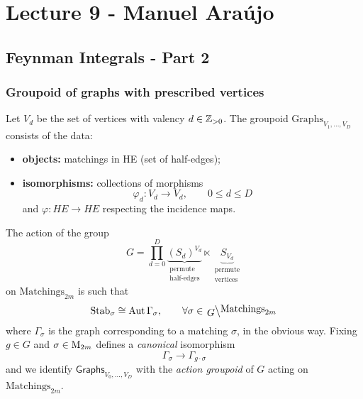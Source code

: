 \chapter{Lecture 9 - Manuel Araújo}

\section{Feynman Integrals - Part 2}

\subsection{Groupoid of graphs with prescribed vertices}

Let $V_d$ be the set of vertices with valency $d \in \mathbb{Z}_{>0}$.
The groupoid $\mathrm{Graphs}_{V_1, \dots, V_D}$ consists of the data:
\begin{itemize}
  \item \textbf{objects:} matchings in HE (set of half-edges);
  \item \textbf{isomorphisms:} collections of morphisms
    \begin{equation*}
      \varphi_d \colon V_d \longrightarrow V_d, \qquad 0 \leq d \leq D
    \end{equation*}
    and $\varphi \colon HE \to HE$ respecting the incidence maps.
\end{itemize}

The action of the group
\begin{equation*}
  G = \prod_{d = 0}^D
  \underbrace{(S_d)^{V_d}}_{\substack{
      \text{permute} \\ \text{half-edges}
  }} \ltimes 
  \underbrace{S_{V_d}}_{\substack{
      \text{permute} \\ \text{vertices}
  }}
\end{equation*}
on $\text{Matchings}_{2m}$ is such that
\begin{equation*}
  \Stab_\sigma \cong \Aut \Gamma_\sigma, \qquad \forall \sigma \in \lbigslant{G}{\text{Matchings}_{2m}}
\end{equation*}
where $\Gamma_\sigma$ is the graph corresponding to a matching $\sigma$, in the obvious way.
Fixing $g \in G$ and $\sigma \in \mathrm{M}_{2m}$ defines a \textit{canonical} isomorphism
\begin{equation*}
  \Gamma_\sigma \longrightarrow \Gamma_{g \cdot \sigma}
\end{equation*}
and we identify $\mathsf{Graphs}_{V_0, \dots, V_D}$ with the \textit{action groupoid} of $G$ acting on $\text{Matchings}_{2m}$.

